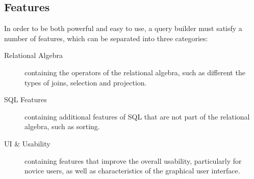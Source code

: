 \documentclass[11pt,a4paper]{globis-book}
\begin{document}
\subsection{Features}
\label{sec:feature_set}
In order to be both powerful and easy to use, a query builder must satisfy a number of features, which can be separated into three categories:

\begin{description}
\item[Relational Algebra] containing the operators of the relational algebra, such as different the types of joins, selection and projection.

\item[SQL Features] containing additional features of SQL that are not part of the relational algebra, such as sorting.

\item[UI \& Usability] containing features that improve the overall usability, particularly for novice users, as well as characteristics of the graphical user interface.
\end{description}
\end{document}
